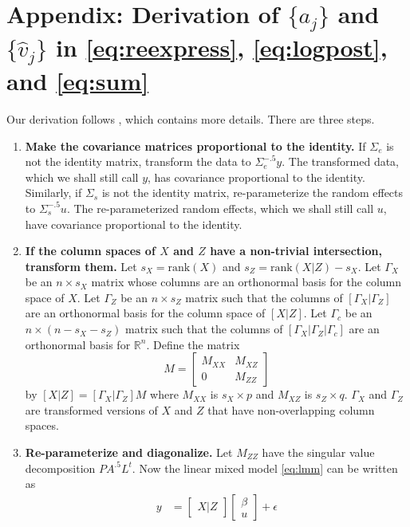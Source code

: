 \documentclass[ejs]{imsart}
\begin{document}
\section{Appendix: Derivation of $\{a_j\}$ and $\{\hat v_j\}$ in \eqref{eq:reexpress}, \eqref{eq:logpost}, and \eqref{eq:sum}}
Our derivation follows \cite{hodges:2013},
which contains more details.  There are three steps.
\begin{enumerate}
  \item \textbf{Make the covariance matrices proportional to the identity.}  If $\Sigma_e$ is not the identity matrix,
    transform the data to $\Sigma_e^{-.5}y$.  The transformed data, which we shall still call $y$, has covariance
    proportional to the identity.  Similarly, if $\Sigma_s$ is not the identity matrix, re-parameterize the random
    effects to $\Sigma_s^{-.5}u$.  The re-parameterized random effects, which we shall still call $u$, have
    covariance proportional to the identity.
  \item \textbf{If the column spaces of $X$ and $Z$ have a non-trivial intersection, transform them.}
    Let $s_X=\text{rank}(X)$  and $s_Z=\text{rank}(X|Z) - s_X$.  Let $\Gamma_X$ be an $n \times s_X$ matrix whose
    columns are an orthonormal basis for the column space of $X$.  Let $\Gamma_Z$ be an $n \times s_Z$ matrix
    such that the columns of $\left[\Gamma_X | \Gamma_Z \right]$ are an orthonormal basis for the column space
    of $\left[X|Z\right]$.  Let $\Gamma_c$ be an $n \times (n-s_X-s_Z)$ matrix such that the columns of
    $\left[\Gamma_X | \Gamma_Z | \Gamma_c\right]$ are an orthonormal basis for $\mathbb{R}^n$.  Define the matrix
    \begin{equation*}
      M = \begin{bmatrix}
               M_{XX} & M_{XZ}\\
               0 & M_{ZZ}
             \end{bmatrix}
    \end{equation*}
    by $[X|Z] = [\Gamma_X|\Gamma_Z]M$ where $M_{XX}$ is $s_X \times p$ and $M_{XZ}$ is $s_Z \times q$.
    $\Gamma_X$ and $\Gamma_Z$ are transformed versions of $X$ and $Z$ that have non-overlapping
    column spaces.
  \item \textbf{Re-parameterize and diagonalize.}  Let $M_{ZZ}$ have the singular value decomposition
    $PA^{.5}L^t$.  Now the linear mixed model \eqref{eq:lmm} can be written as
    \begin{equation*}
      \begin{split}
        y &= \begin{bmatrix} X | Z \end{bmatrix} \begin{bmatrix} \beta \\ u \end{bmatrix} + \epsilon\\

\end{split}
\end{equation*}
\end{enumerate}
\end{document}
